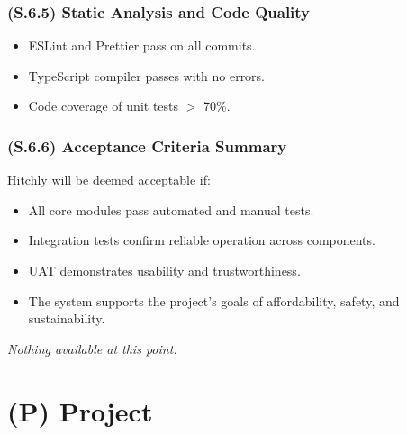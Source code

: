 \documentclass[12pt,letterpaper]{article}
\begin{document}
\subsubsection{(S.6.5) Static Analysis and Code Quality} %
\begin{itemize}
    \item ESLint and Prettier pass on all commits.
    \item TypeScript compiler passes with no errors.
    \item Code coverage of unit tests $>$ 70\%.
\end{itemize}

\subsubsection{(S.6.6) Acceptance Criteria Summary} %
Hitchly will be deemed acceptable if:

\begin{itemize}
    \item All core modules pass automated and manual tests.
    \item Integration tests confirm reliable operation across components.
    \item UAT demonstrates usability and trustworthiness.
    \item The system supports the project’s goals of affordability, safety, and sustainability.
\end{itemize}
\textit{Nothing available at this point.}

\clearpage

\section{(P) Project}
\end{document}
